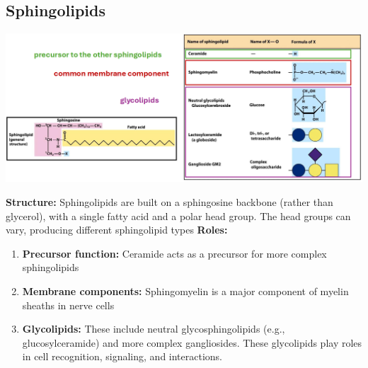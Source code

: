 \documentclass[10pt]{article}
\begin{document}
\subsection*{Sphingolipids}
\begin{center}
    \includegraphics*[width=\textwidth]{L3_9.png}
\end{center}
\textbf{Structure:}  Sphingolipids are built on a sphingosine backbone (rather than glycerol), with a single fatty acid and a polar head group.  The head groups can vary, producing different sphingolipid types
\textbf{Roles:}
\begin{enumerate}
    \item \textbf{Precursor function:} Ceramide acts as a precursor for more complex sphingolipids
    \item \textbf{Membrane components:} Sphingomyelin is a major component of myelin sheaths in nerve cells
    \item \textbf{Glycolipids:} These include neutral glycosphingolipids (e.g., glucosylceramide) and more complex gangliosides.  These glycolipids play roles in cell recognition, signaling, and interactions.
\end{enumerate}
\end{document}
